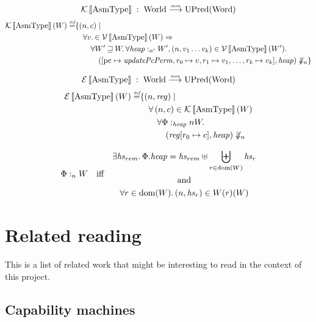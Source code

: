 \documentclass{article}
\newcommand{\update}[2]{[#1 \mapsto #2]}%
\newcommand{\sem}[1]{\left\llbracket #1 \right\rrbracket}
\newcommand{\monfun}{\stackrel{\textit{\tiny{mon}}}{\longrightarrow}}
\newcommand{\defeq}{\stackrel{\textit{\tiny{def}}}{=}}
\DeclareMathOperator{\dom}{dom}
\newcommand{\var}[1]{\mathit{#1}}
\newcommand{\pcreg}{\mathrm{pc}}
\newcommand{\reg}{\var{reg}}
\newcommand{\heapseg}{\var{hs}}
\newcommand{\heap}{\var{heap}}
\newcommand{\plainfun}[1]{\mathit{#1}}
\newcommand{\updatePcPerm}[1]{\plainfun{updatePcPerm}}
\newcommand{\future}{\mathbin{\sqsupseteq}}
\newcommand{\heapSat}[3][\Phi]{#1 :_{#2} #3}
\newcommand{\asmType}{\plaindom{AsmType}}
\newcommand{\plaindom}[1]{\mathrm{#1}}
\newcommand{\Words}{\plaindom{Word}}
\newcommand{\Worlds}{\plaindom{World}}
\newcommand{\UPred}[1]{\plaindom{UPred}(#1)}
\newcommand{\intr}[2]{\mathcal{#1}\sem{#2}}
\newcommand{\valueintr}[1]{\intr{V}{#1}}
\newcommand{\exprintr}[1]{\intr{E}{#1}}
\newcommand{\contintr}[1]{\intr{K}{#1}}
\newcommand{\stdvr}{\valueintr{\asmType}}
\newcommand{\stder}{\exprintr{\asmType}}
\newcommand{\stdkr}{\contintr{\asmType}}
\newcommand{\npair}[2][n]{\left(#1,#2 \right)}
\newcommand{\diverge}[1][n]{\not\Downarrow_{#1}}
\begin{document}
\[
\stdkr \; : \;  \Worlds \monfun \UPred{\Words}%
\]
\begin{align*}
  \stdkr(W) \defeq & \{ \npair{c} \mid \\
                   & \quad \forall v\ldotp \in \stdvr(W) \Rightarrow \\
                   & \qquad  \forall W' \future W\ldotp %
                     \forall \heapSat[\heap]{n'}{W'}, \npair{v_1 \dots v_k} \in \stdvr(W') \ldotp \\
                   & \qquad \quad ([\pcreg \mapsto \updatePcPerm{c},r_0 \mapsto v,r_1 \mapsto v_1,\dots, r_k \mapsto v_k], \heap) \diverge \}
\end{align*}

\[
\stder \; : \;  \Worlds \monfun \UPred{\Words}%
\]
\begin{align*}
  \stder(W) \defeq & \{ \npair{\reg} \mid \\
                   & \quad \forall \npair{c} \in \stdkr(W) \\
                   & \qquad  \forall \heapSat{\heap}{n}{W} \ldotp \\
                   & \qquad \quad (\reg\update{r_0}{c},\heap) \diverge
\end{align*}


\begin{definition}
\begin{align*}
  \heapSat{n}{W} & & \text{iff} & &
                                \begin{gathered}
\exists \heapseg_{rem} \ldotp \Phi.\heap = \heapseg_{rem} \uplus \biguplus_{r\in \dom(W)} \heapseg_r\\
\text{and}\\
\forall r \in \dom(W) \ldotp \npair{\heapseg_r} \in W(r)(W)
\end{gathered}
\end{align*}
\end{definition}
\section{Related reading}
\label{sec:related-reading}

This is a list of related work that might be interesting to read in the context
of this project.

\subsection{Capability machines}
\label{sec:rw-cap-machines}
\end{document}
